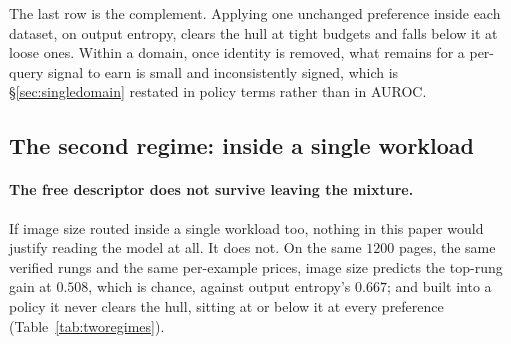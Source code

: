 \documentclass[10pt,twocolumn]{article}
\theoremstyle{plain}
\begin{document}
The last row is the complement. Applying one unchanged preference inside each
dataset, on output entropy, clears the hull at tight budgets and falls below it
at loose ones. Within a domain, once identity is removed, what remains for a
per-query signal to earn is small and inconsistently signed, which is
\S\ref{sec:singledomain} restated in policy terms rather than in AUROC.


\subsection{The second regime: inside a single workload}

\paragraph{The free descriptor does not survive leaving the mixture.} If image
size routed inside a single workload too, nothing in this paper would justify
reading the model at all. It does not. On the same $1200$ pages, the same
verified rungs and the same per-example prices, image size predicts the
top-rung gain at $0.508$, which is chance, against output entropy's $0.667$;
and built into a policy it never clears the hull, sitting at or below it at
every preference (Table~\ref{tab:tworegimes}).

\begin{table}[t]
\centering\small
\setlength{\tabcolsep}{3.5pt}
\caption{The same comparison as Table~\ref{tab:freesignal}, run inside one
workload instead of across four. The hull is built from all four fixed rungs,
$30$ resampled folds, per-example prices. The entropy ladder row is recomputed
on independent resamples and agrees with Table~\ref{tab:convexity} to within
$0.007$.}
\label{tab:tworegimes}
\end{table}
\end{document}
